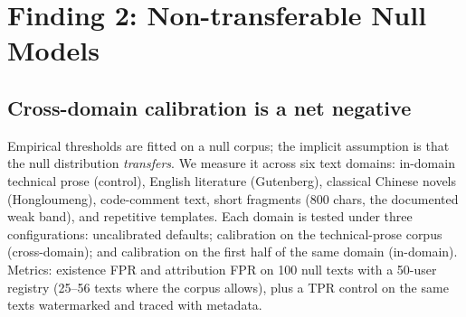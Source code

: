 \section{Finding 2: Non-transferable Null Models}
\label{sec:f2}

\subsection{Cross-domain calibration is a net negative}
Empirical thresholds are fitted on a null corpus; the implicit assumption is
that the null distribution \emph{transfers}. We measure it across six text
domains: in-domain technical prose (control), English literature (Gutenberg),
classical Chinese novels (Hongloumeng), code-comment text, short fragments
(800 chars, the documented weak band), and repetitive templates. Each domain
is tested under three configurations: uncalibrated defaults; calibration on
the technical-prose corpus (cross-domain); and calibration on the first half
of the same domain (in-domain). Metrics: existence FPR and attribution FPR
on 100 null texts with a 50-user registry (25--56 texts where the corpus
allows), plus a TPR control on the same texts watermarked and traced with
metadata.

